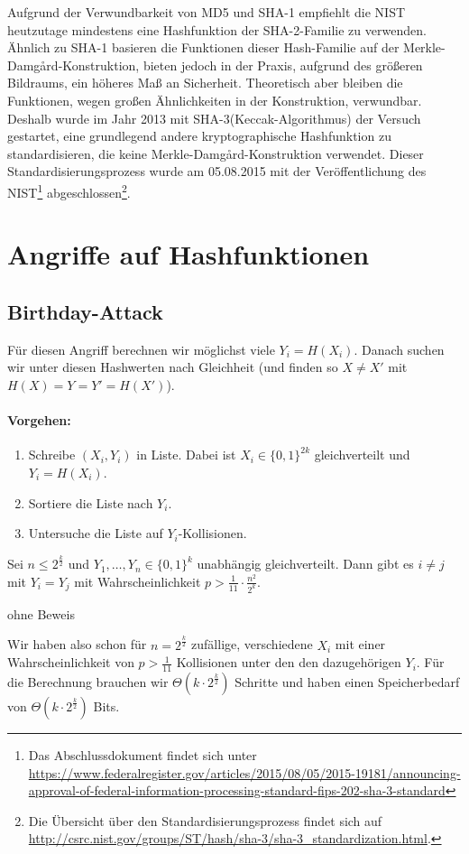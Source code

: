 Aufgrund der Verwundbarkeit von MD5 und SHA-1 empfiehlt die NIST
heutzutage mindestens eine Hashfunktion der SHA-2-Familie\indexSHATwo
zu verwenden. Ähnlich zu SHA-1 basieren die Funktionen dieser
Hash-Familie auf der Merkle-Damgård-Konstruktion, bieten jedoch in der
Praxis, aufgrund des größeren Bildraums, ein höheres Maß an
Sicherheit. Theoretisch aber bleiben die Funktionen, wegen großen
Ähnlichkeiten in der Konstruktion, verwundbar. Deshalb wurde im Jahr
2013 mit SHA-3\indexSHAThree (\glqq Keccak\grqq{}-Algorithmus) der
Versuch gestartet, eine grundlegend andere kryptographische Hashfunktion
zu standardisieren, die keine Merkle-Damgård-Konstruktion
verwendet. Dieser Standardisierungsprozess wurde am 05.08.2015 mit der
Veröffentlichung des NIST\footnote{Das Abschlussdokument findet sich
unter
\url{https://www.federalregister.gov/articles/2015/08/05/2015-19181/announcing-approval-of-federal-information-processing-standard-fips-202-sha-3-standard}}
abgeschlossen\footnote{Die Übersicht über den Standardisierungsprozess
findet sich auf
\url{http://csrc.nist.gov/groups/ST/hash/sha-3/sha-3_standardization.html}.}.


\section{Angriffe auf Hashfunktionen}
\subsection{Birthday-Attack}\indexBirthDayAttack
Für diesen Angriff berechnen wir möglichst viele $Y_i = H(X_i)$.
Danach suchen wir unter diesen Hashwerten nach Gleichheit (und finden so
$X \not = X'$ mit $H(X) = Y = Y' = H(X')$). 
\paragraph*{Vorgehen:}
\begin{enumerate}
  \item Schreibe $(X_i, Y_i)$ in Liste. Dabei ist $X_i \in \{0,1\}^{2k}$
    gleichverteilt und $Y_i = H(X_i)$.  
  \item Sortiere die Liste nach $Y_i$.
  \item Untersuche die Liste auf $Y_i$-Kollisionen.
\end{enumerate}

\begin{theorem}
Sei $n \leq 2^{\frac{k}{2}}$ und $Y_1, \ldots , Y_n \in \{0,1\}^k$
unabhängig gleichverteilt. Dann gibt es $i \not = j$ mit $Y_i = Y_j$ mit
Wahrscheinlichkeit $p > \frac{1}{11} \cdot \frac{n^2}{2^k}$.
\end{theorem}
\begin{beweis}
  ohne Beweis
\end{beweis}
Wir haben also schon für $n = 2^{\frac{k}{2}}$ zufällige, verschiedene
$X_i$ mit einer Wahrscheinlichkeit von $p > \frac{1}{11}$ Kollisionen
unter den den dazugehörigen $Y_i$. Für die Berechnung brauchen wir
$\Theta(k \cdot 2^{\frac{k}{2}})$ Schritte und haben einen
Speicherbedarf von $\Theta(k \cdot 2^{\frac{k}{2}})$ Bits.

